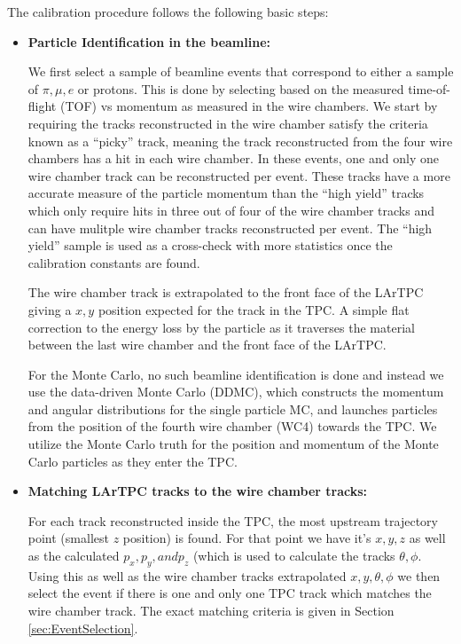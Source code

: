 The calibration procedure follows the following basic steps:
\begin{itemize}

\item \textbf{Particle Identification in the beamline:}

We first select a sample of beamline events that correspond to either a sample of $\pi, \mu, e$ or protons. This is done by selecting based on the measured time-of-flight (TOF) vs momentum as measured in the wire chambers. We start by requiring the tracks reconstructed in the wire chamber satisfy the criteria known as a ``picky'' track, meaning the track reconstructed from the four wire chambers has a hit in each wire chamber. In these events, one and only one wire chamber track can be reconstructed per event. These tracks have a more accurate measure of the particle momentum than the ``high yield'' tracks which only require hits in three out of four of the wire chamber tracks and can have mulitple wire chamber tracks reconstructed per event. The ``high yield'' sample is used as a cross-check with more statistics once the calibration constants are found.

The wire chamber track is extrapolated to the front face of the LArTPC giving a $x, y$ position expected for the track in the TPC. A simple flat correction to the energy loss by the particle as it traverses the material between the last wire chamber and the front face of the LArTPC.

For the Monte Carlo, no such beamline identification is done and instead we use the data-driven Monte Carlo (DDMC), which constructs the momentum and angular distributions for the single particle MC, and launches particles from the position of the fourth wire chamber (WC4) towards the TPC. We utilize the Monte Carlo truth for the position and momentum of the Monte Carlo particles as they enter the TPC.

\item \textbf{Matching LArTPC tracks to the wire chamber tracks:}

For each track reconstructed inside the TPC, the most upstream trajectory point (smallest $z$ position) is found. For that point we have it's $x, y, z$ as well as the calculated $p_{x}, p_{y}, and p_{z}$ (which is used to calculate the tracks $\theta, \phi$. Using this as well as the wire chamber tracks extrapolated $x, y, \theta, \phi$ we then select the event if there is one and only one TPC track which matches the wire chamber track. The exact matching criteria is given in Section \ref{sec:EventSelection}.


\end{itemize}
